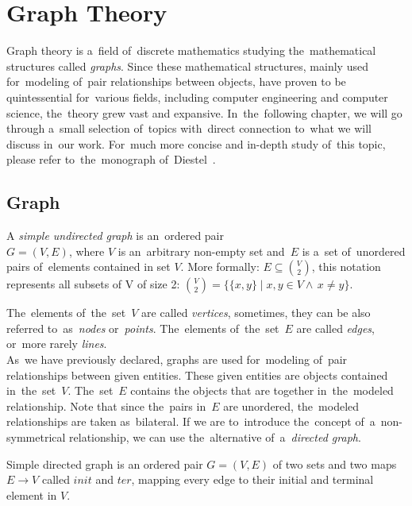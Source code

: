 \chapter{Graph Theory}
Graph theory is a~field of~discrete mathematics studying the~mathematical structures called \textit{graphs}. Since these mathematical structures, mainly used for~modeling of~pair relationships between objects, have proven to be quintessential for~various fields, including computer engineering and computer science, the~theory grew vast and expansive. In~the~following chapter, we will go through a~small selection of~topics with~direct connection to~what we will discuss in~our work. For~much more concise and in-depth study of~this topic, please refer to~the~monograph of~Diestel~\cite{Diestel}.

\section{Graph}
\label{sec:Graph}
\begin{definition}
    A \emph{simple undirected graph} is an~ordered pair\\${G = (V, E)}$, where $V$ is an~arbitrary non-empty set and~$E$ is a~set of~unordered pairs of~elements contained in set $V$.
    More formally: $E \subseteq \binom{V}{2}$, this notation represents all subsets of V of size 2: $\binom{V}{2} = \{\{x, y\} \mid x, y \in V \wedge \, x \neq y\}$.
\end{definition}
The~elements of~the~set~$V$ are called \textit{vertices}, sometimes, they can be also referred to~as~\textit{nodes} or~\textit{points}. The~elements of~the~set~$E$ are called \textit{edges}, or~more rarely \textit{lines}. \\
As~we have previously declared, graphs are used for~modeling of~pair relationships between given entities. These given entities are objects contained in~the~set~$V$. The~set~$E$ contains the objects that are together in~the~modeled relationship. Note that since the~pairs in~$E$ are unordered, the~modeled relationships are taken as~bilateral. If we are to~introduce the~concept of~a~non-symmetrical relationship, we can use the~alternative of~a~\textit{directed graph}.
\iffalse
\begin{definition}
    Simple directed graph is an ordered pair $G = (V, E)$ of two sets and two maps $E \to V$ called $init$ and $ter$, mapping every edge to their initial and terminal element in $V$.
\end{definition}
